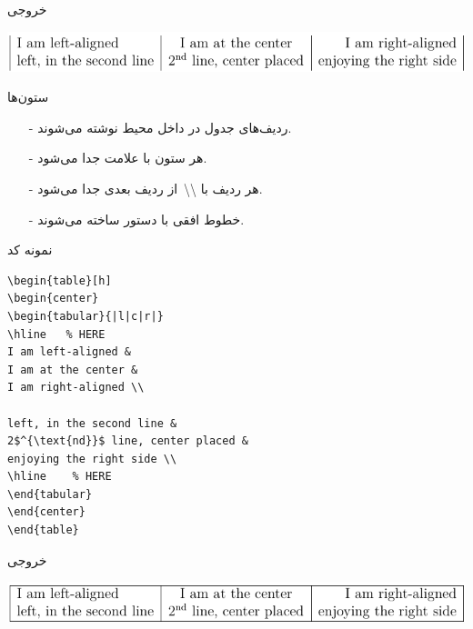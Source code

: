 \begin{frame}{خروجی}
\begin{center}
\includegraphics[width=\textwidth]{docs/images/3}
\end{center}
\end{frame}

\begin{frame}{ستون‌ها}
\begin{itemize}\itemr
\item[-]
ردیف‌‌های جدول در داخل محیط 
نوشته می‌شوند.

\item[-]
هر ستون با علامت 
\lr{\texttt{\&}}
جدا می‌شود.

\item[-] 
هر ردیف با 
\textbackslash \textbackslash $\,$
از ردیف بعدی جدا می‌شود.

\item[-]
خطوط افقی با دستور 
ساخته می‌شوند.
\end{itemize}
\end{frame}

\begin{frame}[fragile]{نمونه کد}
\begin{latin}
\begin{lstlisting}[keywords={begin, end}, keywordstyle=\color{Mulberry}\textbf]
\begin{table}[h]
\begin{center}
\begin{tabular}{|l|c|r|}   
\hline   % HERE
I am left-aligned & 
I am at the center & 
I am right-aligned \\

left, in the second line &
2$^{\text{nd}}$ line, center placed &
enjoying the right side \\
\hline    % HERE
\end{tabular}
\end{center}
\end{table}
\end{lstlisting}
\end{latin}
\end{frame}

\begin{frame}{خروجی}
\begin{center}
\includegraphics[width=\textwidth]{docs/images/flhline}
\end{center}
\end{frame}


